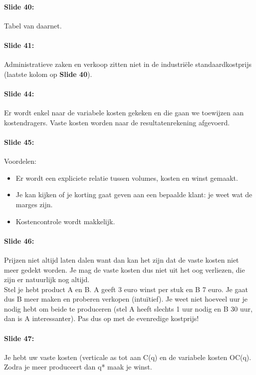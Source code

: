 \documentclass[10pt,a4paper]{report}
\begin{document}
\paragraph{Slide 40:} Tabel van daarnet.

\paragraph{Slide 41:} Administratieve zaken en verkoop zitten niet in de industri\"ele standaardkostprijs (laatste kolom op \textbf{Slide 40}).

\paragraph{Slide 44:} Er wordt enkel naar de variabele kosten gekeken en die gaan we toewijzen aan kostendragers. Vaste kosten worden naar de resultatenrekening afgevoerd.

\paragraph{Slide 45:} Voordelen:
\begin{itemize}
\item Er wordt een expliciete relatie tussen volumes, kosten en winst gemaakt.
\item Je kan kijken of je korting gaat geven aan een bepaalde klant: je weet wat de marges zijn.
\item Kostencontrole wordt makkelijk.
\end{itemize}

\paragraph{Slide 46:} Prijzen niet altijd laten dalen want dan kan het zijn dat de vaste kosten niet meer gedekt worden. Je mag de vaste kosten dus niet uit het oog verliezen, die zijn er natuurlijk nog altijd.\\
Stel je hebt product A en B. A geeft 3 euro winst per stuk en B 7 euro. Je gaat dus B meer maken en proberen verkopen (intu\"itief). Je weet niet hoeveel uur je nodig hebt om beide te produceren (stel A heeft slechts 1 uur nodig en B 30 uur, dan is A interessanter). Pas dus op met de evenredige kostprijs!

\paragraph{Slide 47:} Je hebt uw vaste kosten (verticale as tot aan C(q) en de variabele kosten OC(q). Zodra je meer produceert dan q* maak je winst. 
\end{document}
